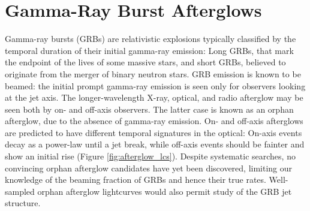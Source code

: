 %
%
%
%
%
%
%

\section{Gamma-Ray Burst Afterglows}
\def\secname{grbs}\label{sec:\secname} %


Gamma-ray bursts (GRBs) are relativistic explosions typically classified by the temporal duration of their initial gamma-ray emission: Long GRBs, that mark the endpoint of the lives of some massive stars, and short GRBs, believed to originate from the merger of binary neutron stars.
GRB emission is known to be beamed: the initial prompt gamma-ray emission is seen only for observers looking at the jet axis. The longer-wavelength X-ray, optical, and radio afterglow may be seen both by on- and off-axis observers.  The latter case is known as an orphan afterglow, due to the absence of gamma-ray emission.  
On- and off-axis afterglows are predicted to have different temporal
signatures in the optical: On-axis events decay as a power-law until a jet
break, while off-axis events should be fainter and show an initial rise
(Figure \ref{fig:afterglow_lcs}).
Despite systematic searches, no convincing orphan afterglow candidates have yet been discovered, limiting our knowledge of the beaming fraction of GRBs and hence their true rates.
Well-sampled orphan afterglow lightcurves would also permit study of the GRB 
jet structure.

